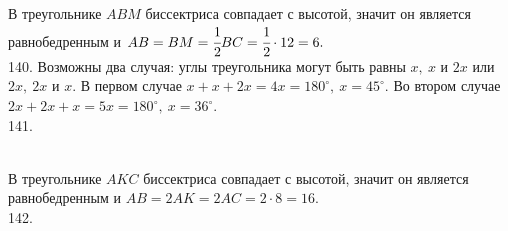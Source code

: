 \documentclass[12pt]{article}
\begin{document}
В треугольнике $ABM$ биссектриса совпадает с высотой, значит он является равнобедренным и $AB=BM=\cfrac{1}{2}BC=\cfrac{1}{2}\cdot12=6.$\\
140. Возможны два случая: углы треугольника могут быть равны $x,\ x$ и $2x$ или $2x,\ 2x$ и $x.$ В первом случае $x+x+2x=4x=180^\circ,\ x=45^\circ.$ Во втором случае $2x+2x+x=5x=180^\circ,\ x=36^\circ.$\\
141. \begin{figure}[ht!]
\end{figure}\\
В треугольнике $AKC$ биссектриса совпадает с высотой, значит он является равнобедренным и $AB=2AK=2AC=2\cdot8=16.$\\
142. \begin{figure}[ht!]
\end{figure}\\
\end{document}
